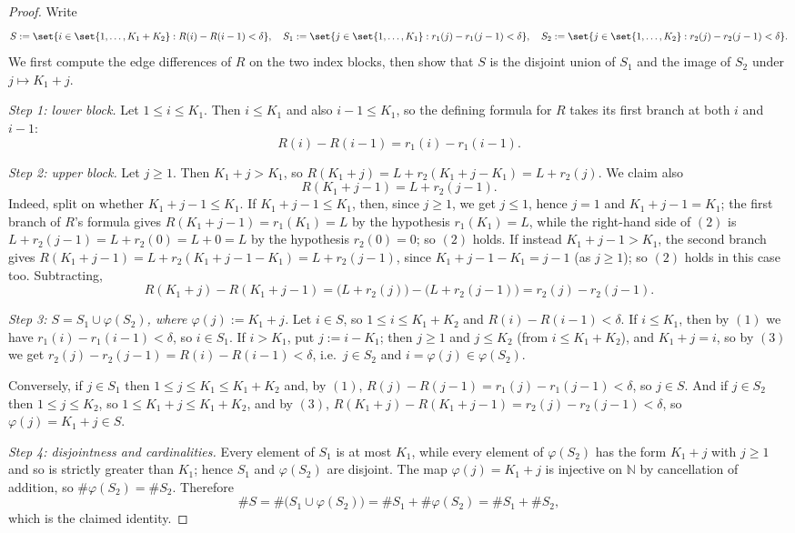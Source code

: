 \begin{proof}
  Write
  \[
    S := \set{i \in \set{1,\dots,K_1+K_2} : R(i)-R(i-1) < \delta}, \quad
    S_1 := \set{j \in \set{1,\dots,K_1} : r_1(j)-r_1(j-1) < \delta}, \quad
    S_2 := \set{j \in \set{1,\dots,K_2} : r_2(j)-r_2(j-1) < \delta}.
  \]
  We first compute the edge differences of $R$ on the two index blocks, then show that $S$ is the
  disjoint union of $S_1$ and the image of $S_2$ under $j \mapsto K_1+j$.

  \emph{Step 1: lower block.} Let $1 \le i \le K_1$. Then $i \le K_1$ and also $i-1 \le K_1$, so the
  defining formula for $R$ takes its first branch at both $i$ and $i-1$:
  \[
    R(i)-R(i-1) = r_1(i)-r_1(i-1)
    . \tag{1}
  \]

  \emph{Step 2: upper block.} Let $j \ge 1$. Then $K_1 + j > K_1$, so $R(K_1+j) = L + r_2(K_1+j-K_1)
  = L + r_2(j)$. We claim also
  \[
    R(K_1+j-1) = L + r_2(j-1)
    . \tag{2}
  \]
  Indeed, split on whether $K_1+j-1 \le K_1$. If $K_1+j-1 \le K_1$, then, since $j \ge 1$, we get
  $j \le 1$, hence $j = 1$ and $K_1+j-1 = K_1$; the first branch of $R$'s formula gives
  $R(K_1+j-1) = r_1(K_1) = L$ by the hypothesis $r_1(K_1)=L$, while the right-hand side of $(2)$ is
  $L + r_2(j-1) = L + r_2(0) = L + 0 = L$ by the hypothesis $r_2(0)=0$; so $(2)$ holds. If instead
  $K_1+j-1 > K_1$, the second branch gives $R(K_1+j-1) = L + r_2(K_1+j-1-K_1) = L + r_2(j-1)$, since
  $K_1+j-1-K_1 = j-1$ (as $j \ge 1$); so $(2)$ holds in this case too. Subtracting,
  \[
    R(K_1+j) - R(K_1+j-1) = \bigl(L + r_2(j)\bigr) - \bigl(L + r_2(j-1)\bigr) = r_2(j)-r_2(j-1)
    . \tag{3}
  \]

  \emph{Step 3: $S = S_1 \cup \varphi(S_2)$, where $\varphi(j) := K_1+j$.} Let $i \in S$, so
  $1 \le i \le K_1+K_2$ and $R(i)-R(i-1) < \delta$. If $i \le K_1$, then by $(1)$ we have
  $r_1(i)-r_1(i-1) < \delta$, so $i \in S_1$. If $i > K_1$, put $j := i-K_1$; then $j \ge 1$ and
  $j \le K_2$ (from $i \le K_1+K_2$), and $K_1+j = i$, so by $(3)$ we get
  $r_2(j)-r_2(j-1) = R(i)-R(i-1) < \delta$, i.e.\ $j \in S_2$ and $i = \varphi(j) \in \varphi(S_2)$.

  Conversely, if $j \in S_1$ then $1 \le j \le K_1 \le K_1+K_2$ and, by $(1)$,
  $R(j)-R(j-1) = r_1(j)-r_1(j-1) < \delta$, so $j \in S$. And if $j \in S_2$ then
  $1 \le j \le K_2$, so $1 \le K_1+j \le K_1+K_2$, and by $(3)$,
  $R(K_1+j)-R(K_1+j-1) = r_2(j)-r_2(j-1) < \delta$, so $\varphi(j) = K_1+j \in S$.

  \emph{Step 4: disjointness and cardinalities.} Every element of $S_1$ is at most $K_1$, while
  every element of $\varphi(S_2)$ has the form $K_1+j$ with $j \ge 1$ and so is strictly greater
  than $K_1$; hence $S_1$ and $\varphi(S_2)$ are disjoint. The map $\varphi(j) = K_1+j$ is
  injective on $\mathbb{N}$ by cancellation of addition, so $\#\varphi(S_2) = \#S_2$. Therefore
  \[
    \#S = \#\bigl(S_1 \cup \varphi(S_2)\bigr) = \#S_1 + \#\varphi(S_2) = \#S_1 + \#S_2
    ,
  \]
  which is the claimed identity.
\end{proof}
